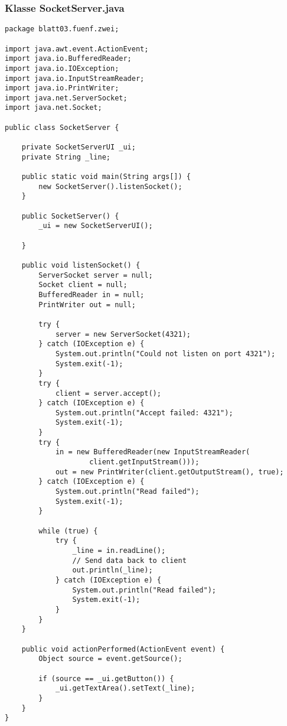 \documentclass[twoside]{article}
\begin{document}
\subsubsection*{Klasse SocketServer.java}
\begin{lstlisting}
package blatt03.fuenf.zwei;

import java.awt.event.ActionEvent;
import java.io.BufferedReader;
import java.io.IOException;
import java.io.InputStreamReader;
import java.io.PrintWriter;
import java.net.ServerSocket;
import java.net.Socket;

public class SocketServer {

	private SocketServerUI _ui;
	private String _line;

	public static void main(String args[]) {
		new SocketServer().listenSocket();
	}

	public SocketServer() {
		_ui = new SocketServerUI();

	}

	public void listenSocket() {
		ServerSocket server = null;
		Socket client = null;
		BufferedReader in = null;
		PrintWriter out = null;
		
		try {
			server = new ServerSocket(4321);
		} catch (IOException e) {
			System.out.println("Could not listen on port 4321");
			System.exit(-1);
		}
		try {
			client = server.accept();
		} catch (IOException e) {
			System.out.println("Accept failed: 4321");
			System.exit(-1);
		}
		try {
			in = new BufferedReader(new InputStreamReader(
					client.getInputStream()));
			out = new PrintWriter(client.getOutputStream(), true);
		} catch (IOException e) {
			System.out.println("Read failed");
			System.exit(-1);
		}

		while (true) {
			try {
				_line = in.readLine();
				// Send data back to client
				out.println(_line);
			} catch (IOException e) {
				System.out.println("Read failed");
				System.exit(-1);
			}
		}
	}

	public void actionPerformed(ActionEvent event) {
		Object source = event.getSource();

		if (source == _ui.getButton()) {
			_ui.getTextArea().setText(_line);
		}
	}
}
\end{lstlisting}
\end{document}
